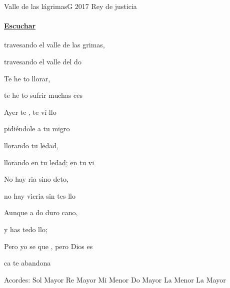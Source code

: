 \documentclass[12pt, spanish]{book}
\newcommand{\NotCCLIed}{\relax}
\begin{document}
    \begin{song}{Valle de las lágrimas}{G}
    {2017} %
    {Rey de justicia}
    {} %
    {} %
        \ifChordBk
        \paragraph{\mbox{}\hfill\protect\href{https://open.spotify.com/intl-es/track/7DGWQVAej7iibHIMWjIMGM}{Escuchar}\mbox{}\hfill}
        \fi

        \begin{SBOpGroup}
            travesando el valle de las grimas,

            travesando el valle del do

            Te he to llorar,

            te he to sufrir muchas ces

            Ayer te , te ví llo

            pidiéndole a  tu migro

              llorando tu ledad,

            llorando en tu ledad; en tu vi
        \end{SBOpGroup}

        \begin{SBChorus}
            No hay ria sino  deto,

            no hay vicria sin tes llo

            Aunque a do duro  cano,

            y has tedo  llo;

            Pero yo se que , pero Dios es 

            ca te abandona
        \end{SBChorus}

        \ifChordBk
        \begin{SBOpGroup}
            Acordes:\break
            \upchord{\G}\qquad Sol Mayor \hfill
            \upchord{\D}\qquad Re Mayor \hfill\null\break
            \upchord{\Em}\qquad Mi Menor \hfill
            \upchord{\C}\qquad Do Mayor \hfill\null\break
            \upchord{\Am}\qquad La Menor \hfill
            \upchord{\A}\qquad La Mayor \hfill\null\break
        \end{SBOpGroup}
        \fi
    \end{song}
\end{document}
